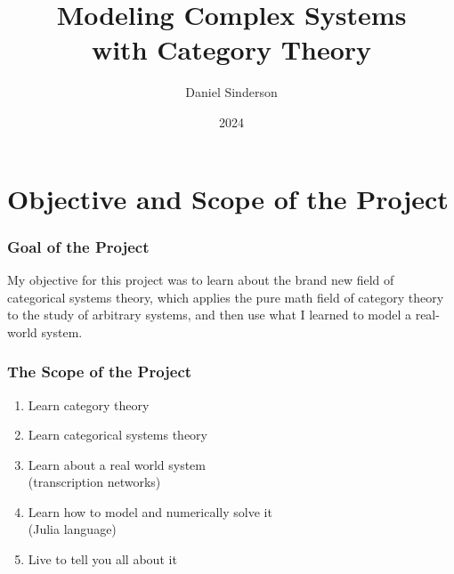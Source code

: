\documentclass{beamer}
\title{Modeling Complex Systems \\with Category Theory}
\author{Daniel Sinderson}
\institute{Southern Oregon University}
\date{2024}
\begin{document}
\frame{\titlepage}



\section{Objective and Scope of the Project}

\begin{frame}
    \frametitle{Goal of the Project}
    \begin{large}
        My objective for this project was to learn about the brand new field of categorical systems theory,
        which applies the pure math field of category theory to the study of arbitrary systems,
        and then use what I learned to model a real-world system.
    \end{large}
\end{frame}

\begin{frame}
    \frametitle{The Scope of the Project}
    \begin{large}
        \begin{enumerate}
            \item Learn category theory
            \item Learn categorical systems theory
            \item Learn about a real world system
                  \\(transcription networks)
            \item Learn how to model and numerically solve it
                  \\(Julia language)
            \item Live to tell you all about it
        \end{enumerate}
    \end{large}

\end{frame}
\end{document}
